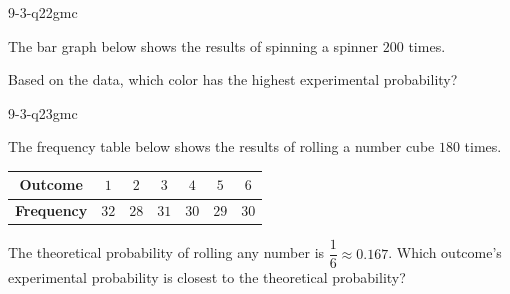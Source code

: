 
\begin{practiceQuestion}{9-3-q22}{gmc}
\begin{questionText}
The bar graph below shows the results of spinning a spinner $200$ times.

\begin{center}
\end{center}

Based on the data, which color has the highest experimental probability?
\end{questionText}
\end{practiceQuestion}

\begin{practiceQuestion}{9-3-q23}{gmc}
\begin{questionText}
The frequency table below shows the results of rolling a number cube $180$ times.

\begin{center}
\begin{tabular}{|c|c|c|c|c|c|c|}
\hline
\textbf{Outcome} & $1$ & $2$ & $3$ & $4$ & $5$ & $6$ \\
\hline
\textbf{Frequency} & $32$ & $28$ & $31$ & $30$ & $29$ & $30$ \\
\hline
\end{tabular}
\end{center}

The theoretical probability of rolling any number is $\dfrac{1}{6} \approx 0.167$. Which outcome's experimental probability is closest to the theoretical probability?
\end{questionText}
\end{practiceQuestion}

